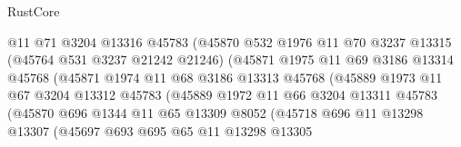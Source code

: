\begin{lexlean}{RustCore}
\begin{coremodule}
                              @11
                              @71
                              @3204
                              @13316
                              @45783
                              (@45870
                                @532
                                @1976
                                @11
                                @70
                                @3237
                                @13315
                                (@45764 @531 @3237 @21242 @21246)
                                (@45871
                                  @1975
                                  @11
                                  @69
                                  @3186
                                  @13314
                                  @45768
                                  (@45871
                                    @1974
                                    @11
                                    @68
                                    @3186
                                    @13313
                                    @45768
                                    (@45889
                                      @1973
                                      @11
                                      @67
                                      @3204
                                      @13312
                                      @45783
                                      (@45889
                                        @1972
                                        @11
                                        @66
                                        @3204
                                        @13311
                                        @45783
                                        (@45870
                                          @696
                                          @1344
                                          @11
                                          @65
                                          @13309
                                          @8052
                                          (@45718
                                            @696
                                            @11
                                            @13298
                                            @13307
                                            (@45697
                                              @693
                                              @695
                                              @65
                                              @11
                                              @13298
                                              @13305

\end{coremodule}
\end{lexlean}
